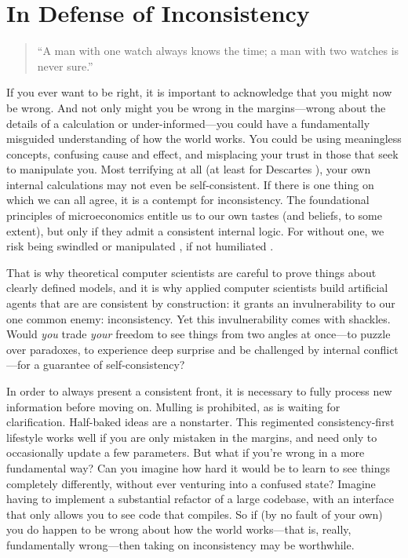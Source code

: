 

\section{In Defense of Inconsistency}

\begin{quotation}
    ``A man with one watch always knows the time;
    a man with two watches is never sure.''
    \\
    \hfill
\end{quotation}

If you ever want to be right, it is important to acknowledge that you might now be wrong.  And not only might you be wrong in the margins---wrong about the details of a calculation or under-informed---you could have a fundamentally misguided understanding of how the world works. You could be using meaningless concepts, confusing cause and effect, and misplacing your trust in those that seek to manipulate you. 
Most terrifying at all (at least for Descartes \cite{descartes}), your own internal calculations may not even be self-consistent.
If there is one thing on which we can all agree, it is a contempt for inconsistency.
The foundational principles of microeconomics entitle us to our own tastes (and beliefs, to some extent), but only if they admit a consistent internal logic.
For without one, we risk being swindled \cite{RAT} or manipulated \cite{explosion}, if not humiliated \cite{logicalfalacy,emptysetthesis,politicians}.

That is why theoretical computer scientists are careful to prove things about clearly defined models,
and it is why applied computer scientists build artificial agents that are are consistent by construction:
  it grants an invulnerability to our one common enemy: inconsistency.
%
Yet this invulnerability comes with shackles.
Would \emph{you} trade \emph{your} freedom to see things from two angles at once---to puzzle over paradoxes, to experience deep surprise and be challenged by internal conflict---for a guarantee of self-consistency?

In order to always present a consistent front, it is necessary to fully process new information before moving on. Mulling is prohibited, as
is waiting for clarification.
Half-baked ideas are a nonstarter.
This regimented consistency-first lifestyle works well if you are only mistaken in the margins, and need only to occasionally update a few parameters.
But what if you're wrong in a more fundamental way?
Can you imagine how hard it would be to learn to see things completely differently, without ever venturing into a confused state?
Imagine having to implement a substantial refactor of a large codebase, with an interface that only allows you to see code that compiles.
So if (by no fault of your own) you do happen to be wrong about how the world works---that is, really, fundamentally wrong---then taking on inconsistency may be worthwhile.

